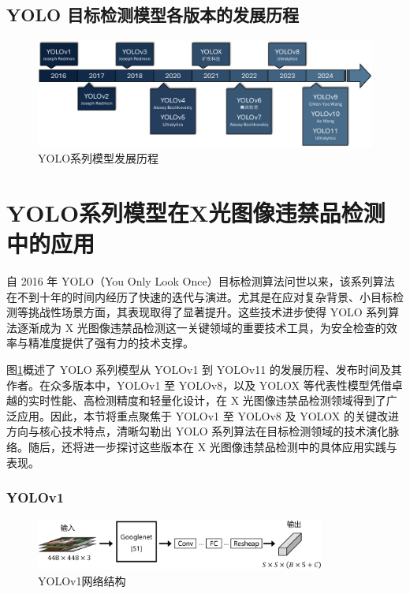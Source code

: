 \documentclass[11pt,twocolumn]{ctexart}
\begin{document}
\subsection{YOLO 目标检测模型各版本的发展历程}

\begin{figure}[!htbp]
  \begin{center}
    \includegraphics[width=\textwidth]{figure/发展流程图}
    \end{center}
  \caption{YOLO系列模型发展历程}
  \label{发展流程}
\end{figure}

\section{YOLO系列模型在X光图像违禁品检测中的应用}

自 2016 年 YOLO（You Only Look Once）目标检测算法问世以来，该系列算法在不到十年的时间内经历了快速的迭代与演进。尤其是在应对复杂背景、小目标检测等挑战性场景方面，其表现取得了显著提升。这些技术进步使得 YOLO 系列算法逐渐成为 X 光图像违禁品检测这一关键领域的重要技术工具，为安全检查的效率与精准度提供了强有力的技术支撑。

图\ref{发展流程}概述了 YOLO 系列模型从 YOLOv1 到 YOLOv11 的发展历程、发布时间及其作者。在众多版本中，YOLOv1 至 YOLOv8，以及 YOLOX 等代表性模型凭借卓越的实时性能、高检测精度和轻量化设计，在 X 光图像违禁品检测领域得到了广泛应用。因此，本节将重点聚焦于 YOLOv1 至 YOLOv8 及 YOLOX 的关键改进方向与核心技术特点，清晰勾勒出 YOLO 系列算法在目标检测领域的技术演化脉络。随后，还将进一步探讨这些版本在 X 光图像违禁品检测中的具体应用实践与表现。




\subsubsection{YOLOv1}

\begin{figure}[!hbtp]
  \begin{center}
  \includegraphics[width=0.85\textwidth]{figure/YOLOv1结构图}
    \end{center}
  \caption{YOLOv1网络结构}
  \label{YOLOV1网络结构}
\end{figure}
\end{document}
